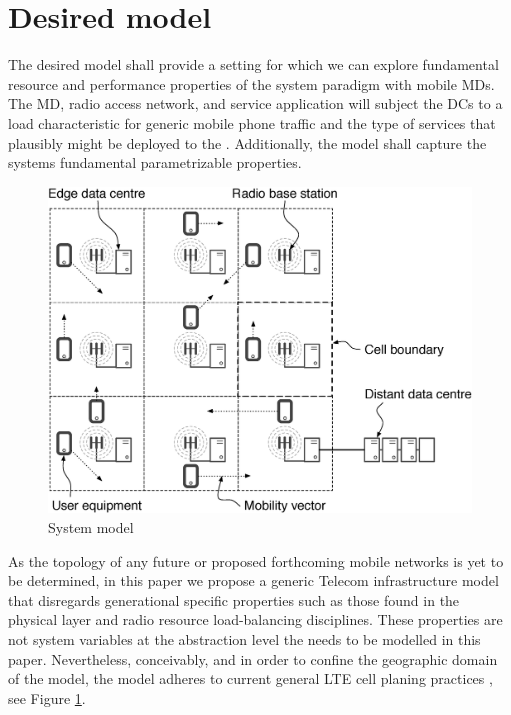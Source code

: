 \section{Desired model}
\label{sec:desiard_model}

The desired model shall provide a setting for which we can explore fundamental resource and performance properties of the \xcloud{} system paradigm with mobile \ac{MD}s. The \ac{MD}, radio access network, and service application will subject the \ac{DC}s to a load characteristic for generic mobile phone traffic and the type of services that plausibly might be deployed to the \xcloud{}. Additionally, the model shall capture the systems fundamental parametrizable properties.

\begin{figure}[tb]
	\centering
	\includegraphics[width=\linewidth]{fig_system_model.eps} 
	\caption{System model}
	\label{fig:system_model}
\end{figure}

As the topology of any future \xcloud{} or proposed forthcoming mobile networks is yet to be determined, in this paper we propose a generic Telecom infrastructure model that disregards generational specific properties such as those found in the physical layer and radio resource load-balancing disciplines. These properties are not system variables at the abstraction level the \xcloud{} needs to be modelled in this paper. Nevertheless, conceivably, and in order to confine the geographic domain of the model, the model adheres to current general LTE cell planing practices \cite{salo2010practical}, see Figure \ref{fig:system_model}.

